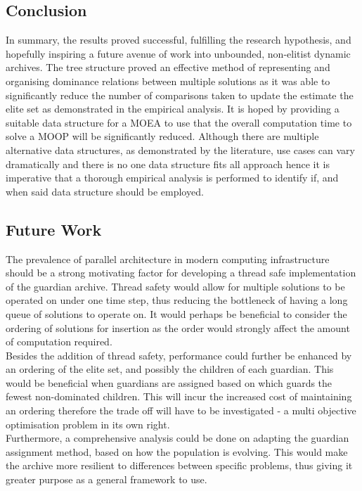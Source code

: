\documentclass{ecmm427_assignment}
\begin{document}
\subsection{Conclusion}
In summary, the results proved successful, fulfilling the research hypothesis, and hopefully inspiring a future avenue of work into unbounded, non-elitist dynamic archives. The tree structure proved an effective method of representing and organising dominance relations between multiple solutions as it was able to significantly reduce the number of comparisons taken to update the estimate the elite set as demonstrated in the empirical analysis.
It is hoped by providing a suitable data structure for a MOEA to use that the overall computation time to solve a MOOP will be significantly reduced. Although there are multiple alternative data structures, as demonstrated by the literature, use cases can vary dramatically and there is no one data structure fits all approach hence it is imperative that a thorough empirical analysis is performed to identify if, and when said data structure should be employed.

\subsection{Future Work}
The prevalence of parallel architecture in modern computing infrastructure should be a strong motivating factor for developing a thread safe implementation of the guardian archive. Thread safety would allow for multiple solutions to be operated on under one time step, thus reducing the bottleneck of having a long queue of solutions to operate on. It would perhaps be beneficial to consider the ordering of solutions for insertion as the order would strongly affect the amount of computation required.\\
Besides the addition of thread safety, performance could further be enhanced by an ordering of the elite set, and possibly the children of each guardian. This would be beneficial when guardians are assigned based on which guards the fewest non-dominated children. This will incur the increased cost of maintaining an ordering therefore the trade off will have to be investigated - a multi objective optimisation problem in its own right.\\
Furthermore, a comprehensive analysis could be done on adapting the guardian assignment method, based on how the population is evolving. This would make the archive more resilient to differences between specific problems, thus giving it greater purpose as a general framework to use.

\newpage


\end{document}
